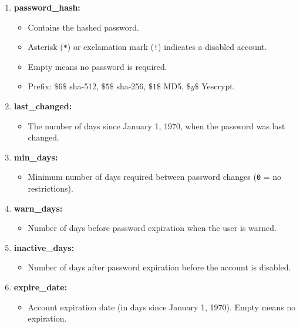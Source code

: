\begin{enumerate}
    \item \textbf{password\_hash:}
    \begin{itemize}
        \item Contains the hashed password.
        \item Asterisk (\texttt{*}) or exclamation mark (\texttt{!}) indicates a disabled account.
        \item Empty means no password is required.
        \item Prefix: \(\$6\$\) \textrightarrow sha-512, \(\$5\$\) \textrightarrow sha-256, \(\$1\$\) \textrightarrow MD5, \(\$y\$\) \textrightarrow Yescrypt.
    \end{itemize}

    \item \textbf{last\_changed:}
    \begin{itemize}
        \item The number of days since January 1, 1970, when the password was last changed.
    \end{itemize}

    \item \textbf{min\_days:}
    \begin{itemize}
        \item Minimum number of days required between password changes (\texttt{0} = no restrictions).
    \end{itemize}

    \item \textbf{warn\_days:}
    \begin{itemize}
        \item Number of days before password expiration when the user is warned.
    \end{itemize}

    \item \textbf{inactive\_days:}
    \begin{itemize}
        \item Number of days after password expiration before the account is disabled.
    \end{itemize}

    \item \textbf{expire\_date:}
    \begin{itemize}
        \item Account expiration date (in days since January 1, 1970). Empty means no expiration.
    \end{itemize}
\end{enumerate}